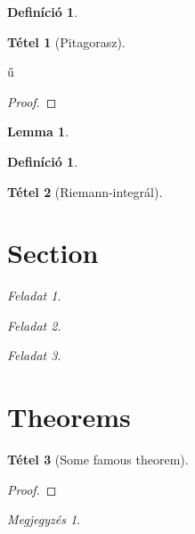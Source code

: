 \documentclass{article}
\theoremstyle{plain}
\newtheorem*{tet1}{Tétel}
\newtheorem{tet2}{Tétel}
\newtheorem{lemma}[tet2]{Lemma}
\theoremstyle{definition}
\newtheorem*{defin1}{Definíció}
\newtheorem{defin2}{Definíció}
\theoremstyle{remark}
\newtheorem*{megjegyzés}{Megjegyzés}
\newtheorem{feladat}{Feladat}[section]
\begin{document}
	\pagebreak
	
	\begin{defin1}
	\hulipsum[1]
	\end{defin1}
	
	\begin{tet1}[Pitagorasz]
	\hulipsum[1]
	\end{tet1}ű
	
	\begin{proof}
	\hulipsum[1]
	\end{proof}
	
\pagebreak	
	
	\begin{lemma}
	\hulipsum[1]
	\end{lemma}
	
	\begin{defin2}
	\hulipsum[1]
	\end{defin2}
	
	\begin{tet2}[Riemann-integrál]
	\hulipsum[3]
	\end{tet2}
	
\pagebreak

	\section{Section}
		\begin{feladat}
		\hulipsum[1]
		\end{feladat}
		
		\begin{feladat}
		\hulipsum[1]
		\end{feladat}
		
		\begin{feladat}
		\hulipsum[1]
		\end{feladat}
	
	\section{Theorems}
		\begin{tet2}[Some famous theorem]
		\hulipsum[1]
		\end{tet2}
		
		\begin{proof}
		\hulipsum[1]
		\end{proof}
		
		\begin{megjegyzés}
		\hulipsum[1]
		\end{megjegyzés}
		
\end{document}
